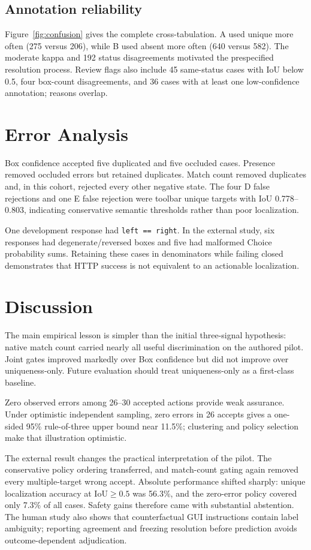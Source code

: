 \documentclass[10pt,twocolumn]{article}
\begin{document}
\subsection{Annotation reliability}
Figure~\ref{fig:confusion} gives the complete cross-tabulation. A used unique more often (275 versus 206), while B used absent more often (640 versus 582). The moderate kappa and 192 status disagreements motivated the prespecified resolution process. Review flags also include 45 same-status cases with IoU below 0.5, four box-count disagreements, and 36 cases with at least one low-confidence annotation; reasons overlap.

\section{Error Analysis}
Box confidence accepted five duplicated and five occluded cases. Presence removed occluded errors but retained duplicates. Match count removed duplicates and, in this cohort, rejected every other negative state. The four D false rejections and one E false rejection were toolbar unique targets with IoU 0.778--0.803, indicating conservative semantic thresholds rather than poor localization.

One development response had \texttt{left == right}. In the external study, six responses had degenerate/reversed boxes and five had malformed Choice probability sums. Retaining these cases in denominators while failing closed demonstrates that HTTP success is not equivalent to an actionable localization.

\section{Discussion}
The main empirical lesson is simpler than the initial three-signal hypothesis: native match count carried nearly all useful discrimination on the authored pilot. Joint gates improved markedly over Box confidence but did not improve over uniqueness-only. Future evaluation should treat uniqueness-only as a first-class baseline.

Zero observed errors among 26--30 accepted actions provide weak assurance. Under optimistic independent sampling, zero errors in 26 accepts gives a one-sided 95\% rule-of-three upper bound near 11.5\%; clustering and policy selection make that illustration optimistic.

The external result changes the practical interpretation of the pilot. The conservative policy ordering transferred, and match-count gating again removed every multiple-target wrong accept. Absolute performance shifted sharply: unique localization accuracy at IoU$\ge0.5$ was 56.3\%, and the zero-error policy covered only 7.3\% of all cases. Safety gains therefore came with substantial abstention. The human study also shows that counterfactual GUI instructions contain label ambiguity; reporting agreement and freezing resolution before prediction avoids outcome-dependent adjudication.
\end{document}
